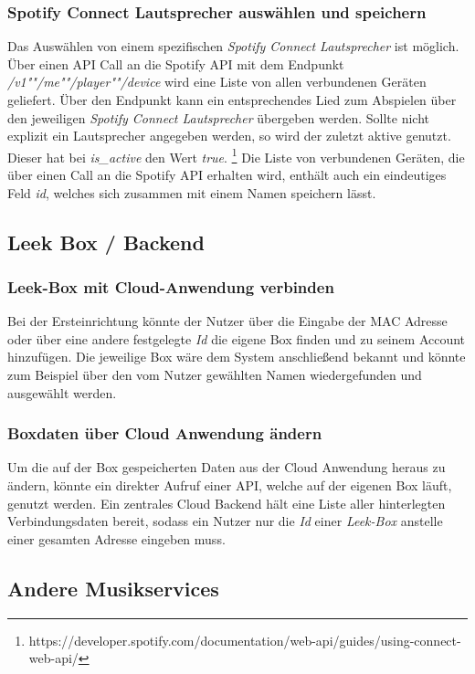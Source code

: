 \documentclass[10pt, a4paper]{article}
\begin{document}
\begin{onehalfspace}
\subsubsection*{Spotify Connect Lautsprecher auswählen und speichern}
Das Auswählen von einem spezifischen \textit{Spotify Connect Lautsprecher} ist möglich.
Über einen API Call an die Spotify API mit dem Endpunkt \textit{/v1""/me""/player""/device} wird eine Liste von allen verbundenen Geräten geliefert. Über den Endpunkt kann ein entsprechendes Lied zum Abspielen über den jeweiligen \textit{Spotify Connect Lautsprecher} übergeben werden.
Sollte nicht explizit ein Lautsprecher angegeben werden, so wird der zuletzt aktive genutzt. Dieser hat bei \textit{is\_active} den Wert \textit{true}. \footnote{https://developer.spotify.com/documentation/web-api/guides/using-connect-web-api/}
Die Liste von verbundenen Geräten, die über einen Call an die Spotify API erhalten wird, enthält auch ein eindeutiges Feld \textit{id}, welches sich zusammen mit einem Namen speichern lässt.

\subsection{Leek Box / Backend}
\subsubsection*{Leek-Box mit Cloud-Anwendung verbinden}
Bei der Ersteinrichtung könnte der Nutzer über die Eingabe der MAC Adresse oder über eine andere festgelegte \textit{Id} die eigene Box finden und zu seinem Account hinzufügen.
Die jeweilige Box wäre dem System anschließend bekannt und könnte zum Beispiel über den vom Nutzer gewählten Namen wiedergefunden und ausgewählt werden.

\subsubsection*{Boxdaten über Cloud Anwendung ändern}
Um die auf der Box gespeicherten Daten aus der Cloud Anwendung heraus zu ändern, könnte ein direkter Aufruf einer API, welche auf der eigenen Box läuft, genutzt werden.
Ein zentrales Cloud Backend hält eine Liste aller hinterlegten Verbindungsdaten bereit, sodass ein Nutzer nur die \textit{Id} einer \textit{Leek-Box} anstelle einer gesamten Adresse eingeben muss.

\subsection{Andere Musikservices}

\end{onehalfspace}
\end{document}
